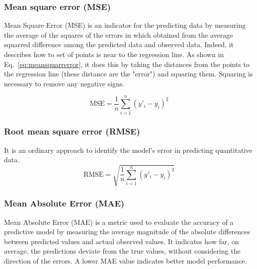 \documentclass[pdflatex,sn-mathphys-num]{sn-jnl}%
\theoremstyle{thmstyleone}%
\theoremstyle{thmstyletwo}%
\theoremstyle{thmstylethree}%
\begin{document}
\subsubsection{Mean square error (MSE)}
Mean Square Error (MSE) is an indicator for the predicting data by measuring the average of the squares of the errors in which obtained from the average squarred difference among the predicted data and observed data. Indeed, it describes how to set of points is near to the regression line. As shown in Eq.~\eqref{eq:meansquarrerror}, it does this by taking the distances from the points to the regression line (these distance are the "error") and squaring them. Squaring is necessary to remove any negative signs.

\begin{equation}
\mathrm{MSE} = \frac{1}{n} \sum_{i=1}^{n} \left( y'_i - y_i \right)^2
\tag{15}
\label{eq:meansquareerror}
\end{equation}

\subsubsection{Root mean square error (RMSE)}
It is an ordinary approach to identify the model's error in predicting quantitative data.
\begin{equation}
\mathrm{RMSE} = \sqrt{ \frac{1}{n} \sum_{i=1}^{n} \left( y'_i - y_i \right)^2 }
\tag{16}
\label{eq:rootmeanse}
\end{equation}

\subsubsection{Mean Absolute Error (MAE)}
Mean Absolute Error (MAE) is a metric used to evaluate the accuracy of a predictive model by measuring the average magnitude of the absolute differences between predicted values and actual observed values. It indicates how far, on average, the predictions deviate from the true values, without considering the direction of the errors. A lower MAE value indicates better model performance.

\end{document}
